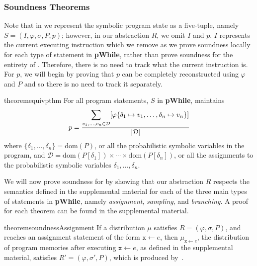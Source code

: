 \documentclass[acmsmall,review,anonymous]{acmart}\settopmatter{printfolios=true,printccs=false,printacmref=false}
\DeclarePairedDelimiter{\abs}{\lvert}{\rvert}
\newcommand*\dom[1]{\mathrm{dom}\left( #1 \right)}
\begin{document}
\subsubsection{Soundness Theorems}
\label{sec:proofs}

Note that in  we represent the symbolic program state as a five-tuple, namely $S = (I, \varphi, \sigma, P, p)$; however, in our abstraction $R$, we omit $I$ and $p$.
% 
$I$ represents the current executing instruction which we remove as we prove soundness locally for each type of statement in \textbf{pWhile}, rather than prove soundness for the entirety of .
% 
Therefore, there is no need to track what the current instruction is.
% 
For $p$, we will begin by proving that $p$ can be completely reconstructed using $\varphi$ and $P$ and so there is no need to track it separately.
\begin{restatable}{theorem}{equivpthm}
  For all program statements, $S$ in \textbf{pWhile},  maintains
  \[
    p = \frac{\displaystyle\sum_{v_1,\ldots,v_n \in \mathcal{D}} [ \varphi\{\delta_1 \mapsto v_1, \ldots, \delta_n \mapsto v_n\} ]}{\abs{\mathcal{D}}}
  \]
  where $\{\delta_1,\ldots,\delta_n\} = \dom{P}$, or all the probabilistic symbolic variables in the program, and $\mathcal{D} = \dom{P[\delta_1]} \times \cdots \times \dom{P[\delta_n]}$, or all the assignments to the probabilistic symbolic variables $\delta_1,\ldots,\delta_n$.
\end{restatable}

We will now prove soundness for  by showing that our abstraction $R$ respects the semantics defined in the supplemental material for each of the three main types of statements in \textbf{pWhile}, namely \textit{assignment}, \textit{sampling}, and \textit{branching}. A proof for each theorem can be found in the supplemental material.

\begin{restatable}{theorem}{soundnessAssignment}
  If a distribution $\mu$ satisfies $R=(\varphi,\sigma,P)$, and~ reaches an assignment statement of the form $\mathtt{x} \gets e$, then $\mu_{\mathtt{x}\gets e}$, the distribution of program memories after executing $\mathtt{x} \gets e$, as defined in the supplemental material, satisfies $R'=(\varphi,\sigma',P)$, which is produced by~.
\end{restatable}
\end{document}
